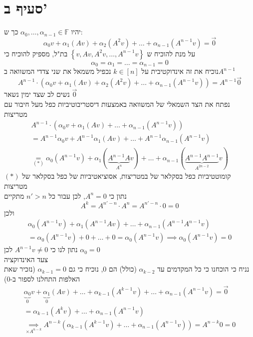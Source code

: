 \documentclass[12pt, titlepage]{article}
\begin{document}
\section*{סעיף ב'}
יהיו $\alpha_0,\ldots,\alpha_{n-1}\in\mathbb{F}$ כך ש:
\[
    \alpha_0v+\alpha_1\left(Av\right)+\alpha_2\left(A^2v\right)+\ldots+\alpha_{n-1}\left(A^{n-1}v\right) =\vec{0}
\]
על מנת להוכיח ש $\left\{v,Av,A^2v,\ldots,A^{n-1}v\right\}$ בת"ל, מספיק להוכיח כי
\[
    \alpha_0=\alpha_1=\ldots=\alpha_{n-1}=0
\]
נוכיח את זה אינדוקטיבית על $k\in\left[n\right]$
נכפיל משמאל את שני צדדי המשוואה ב$A^{n-1}$
\[
    A^{n-1}\cdot\left(\alpha_0v+\alpha_1\left(Av\right)+\alpha_2\left(A^2v\right)+\ldots+\alpha_{n-1}\left(A^{n-1}v\right) \right)=A^{n-1}\vec{0}
\]
נשים לב שצד ימין נשאר $\vec{0}$\\
נפתח את הצד השמאלי של המשוואה באמצעות דיסטריבוטיביות כפל מעל חיבור עם מטריצות
\begin{gather*}
A^{n-1}\cdot\left(\alpha_0v+\alpha_1\left(Av\right)+\ldots+\alpha_{n-1}\left(A^{n-1}v\right) \right)\\
=A^{n-1}\alpha_0v + A^{n-1}\alpha_1\left(Av\right) +\ldots+A^{n-1}\alpha_{n-1}\left(A^{n-1}v\right)\\
 \underset{\left(*\right)}{=}\alpha_0\left(A^{n-1}v \right)+\alpha_1\left(\underbrace{A^{n-1}A}_{A^n}v\right) +\ldots+\alpha_{n-1}\left(\underbrace{A^{n-1}A^{n-1}}_{A^{2n-2}}v\right)
\end{gather*}
$\left(*\right)$ קומוטטיביות כפל בסקלאר של במטריצות, אסוציאטיביות של כפל בסקלאר של מטריצות\\
נתון כי $A^n=0$, לכן עבור כל $n'>n$ מתקיים
\[
    A^k = A^{n'-n}\cdot A^n = A^{n'-n} \cdot 0 = 0
\]
ולכן
\begin{gather*}
\alpha_0\left(A^{n-1}v \right)+\alpha_1\left(A^{n-1}Av\right) +\ldots+\alpha_{n-1}\left(A^{n-1}A^{n-1}v\right) \\
= \alpha_0\left(A^{n-1}v\right) + 0 + \ldots + 0 = \alpha_0\left(A^{n-1}v\right) \implies \alpha_0\left(A^{n-1}v\right) =0
\end{gather*}
נתון לנו כי $A^{n-1}v\neq0$ לכן $\alpha_0 = 0$\\
צעד האינדוקציה\\
נניח כי הוכחנו כי כל המקדמים עד $\alpha_{k-2}$ (כולל) הם $0$, נוכיח כי גם $\alpha_{k-1}=0$ (נזכיר שאת האלפות התחלנו לספור ב-$0$)
\begin{gather*}
    \underbrace{\alpha_0}_{0}v+\underbrace{\alpha_1}_{0}\left(Av\right)+\ldots+\alpha_{k-1}\left(A^{k-1}v\right)+\ldots+\alpha_{n-1}\left(A^{n-1}v\right) =\vec{0}\\
    = \alpha_{k-1}\left(A^kv\right)+\ldots+\alpha_{n-1}\left(A^{n-1}v\right)\\
    \underset{\times A^{n-k}}{\implies} A^{n-k}\left(\alpha_{k-1}\left(A^{k-1}v\right)+\ldots+\alpha_{n-1}\left(A^{n-1}v\right)\right) =A^{n-k} 0=0
\end{gather*}
\end{document}
